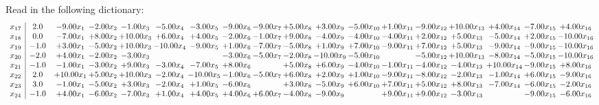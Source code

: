 \documentclass[9pt]{article}
\begin{document}
Read in the following dictionary:
\[\begin{array}{c| c c@{\hskip 2pt} c@{\hskip 2pt} c@{\hskip 2pt} c@{\hskip 2pt} c@{\hskip 2pt} c@{\hskip 2pt} c@{\hskip 2pt} c@{\hskip 2pt} c@{\hskip 2pt} c@{\hskip 2pt} c@{\hskip 2pt} c@{\hskip 2pt} c@{\hskip 2pt} c@{\hskip 2pt} c@{\hskip 2pt} c@{\hskip 2pt} }
 x_{17}   &  2.0 & -9.00 x_{1} & -2.00 x_{2} & -1.00 x_{3} & -5.00 x_{4} & -3.00 x_{5} & -9.00 x_{6} & -9.00 x_{7} & +  5.00 x_{8} & +  3.00 x_{9} & -5.00 x_{10} & +  1.00 x_{11} & -9.00 x_{12} & + 10.00 x_{13} & +  4.00 x_{14} & -7.00 x_{15} & +  4.00 x_{16}\\
 x_{18}   &  0.0 & -7.00 x_{1} & +  8.00 x_{2} & + 10.00 x_{3} & +  6.00 x_{4} & +  4.00 x_{5} & -2.00 x_{6} & -1.00 x_{7} & +  9.00 x_{8} & -4.00 x_{9} & -4.00 x_{10} & -4.00 x_{11} & +  2.00 x_{12} & +  5.00 x_{13} & -5.00 x_{14} & +  2.00 x_{15} & -10.00 x_{16}\\
 x_{19}   &  -1.0 & +  3.00 x_{1} & -5.00 x_{2} & + 10.00 x_{3} & -10.00 x_{4} & -9.00 x_{5} & +  1.00 x_{6} & -7.00 x_{7} & -5.00 x_{8} & +  1.00 x_{9} & +  7.00 x_{10} & -9.00 x_{11} & +  7.00 x_{12} & +  5.00 x_{13} & -9.00 x_{14} & -9.00 x_{15} & -10.00 x_{16}\\
 x_{20}   &  -2.0 & +  4.00 x_{1} & -2.00 x_{2} & -3.00 x_{3} &    &   & -3.00 x_{6} & -5.00 x_{7} & -2.00 x_{8} & -10.00 x_{9} & -5.00 x_{10} &   & -5.00 x_{12} & + 10.00 x_{13} & -8.00 x_{14} & -5.00 x_{15} & -10.00 x_{16}\\
 x_{21}   &  -1.0 & -1.00 x_{1} & -3.00 x_{2} & +  9.00 x_{3} & -3.00 x_{4} & -7.00 x_{5} & +  8.00 x_{6} &   & +  5.00 x_{8} & +  6.00 x_{9} & -4.00 x_{10} & -1.00 x_{11} & -4.00 x_{12} & -4.00 x_{13} & + 10.00 x_{14} & -9.00 x_{15} & +  8.00 x_{16}\\
 x_{22}   &  2.0 & + 10.00 x_{1} & +  5.00 x_{2} & + 10.00 x_{3} & -2.00 x_{4} & -10.00 x_{5} & -1.00 x_{6} & -5.00 x_{7} & +  6.00 x_{8} & +  2.00 x_{9} & +  1.00 x_{10} & -9.00 x_{11} & -8.00 x_{12} & -2.00 x_{13} & -1.00 x_{14} & +  6.00 x_{15} & -9.00 x_{16}\\
 x_{23}   &  3.0 & -1.00 x_{1} & -5.00 x_{2} & +  3.00 x_{3} & -2.00 x_{4} & +  1.00 x_{5} & -6.00 x_{6} &   & +  3.00 x_{8} & -5.00 x_{9} & +  6.00 x_{10} & +  7.00 x_{11} & +  5.00 x_{12} & +  8.00 x_{13} & -7.00 x_{14} & -6.00 x_{15} & -2.00 x_{16}\\
 x_{24}   &  -1.0 & +  4.00 x_{1} & -6.00 x_{2} & -7.00 x_{3} & +  1.00 x_{4} & +  4.00 x_{5} & +  4.00 x_{6} & +  6.00 x_{7} & -4.00 x_{8} & -9.00 x_{9} &   & +  9.00 x_{11} & +  9.00 x_{12} & -3.00 x_{13} &   & -9.00 x_{15} & -6.00 x_{16}\\

\end{array}\]
\end{document}

